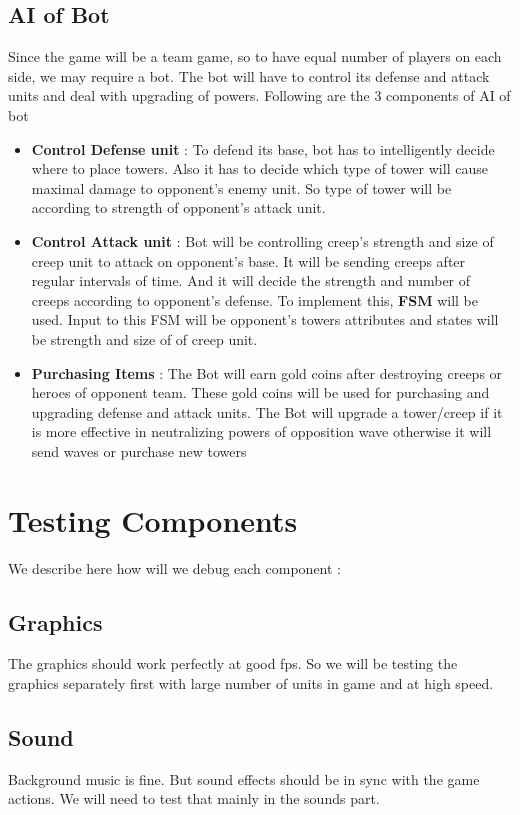 \documentclass{article}
\begin{document}
\subsection{AI of Bot}
Since the game will be a team game, so to have equal number of players on each side, we may require a bot. The bot will have to control its defense and attack units and deal with upgrading of powers. Following are the 3 components of AI of bot
\begin{itemize}
\item \textbf{Control Defense unit} : To defend its base, bot has to intelligently decide where to place towers. Also it has to decide which type of tower will cause maximal damage to opponent's enemy unit. So type of tower will be according to strength of opponent's attack unit.

\item \textbf{Control Attack unit} : Bot will be controlling creep's strength and size of creep unit to attack on opponent's base. It will be sending creeps after regular intervals of time. And it will decide the strength and number of creeps according to opponent's defense. To implement this, \textbf{FSM} will be used. Input to this FSM will be opponent's towers attributes and states will be strength and size of of creep unit. 

\item \textbf{Purchasing Items} : The Bot will earn gold coins after destroying creeps or heroes of opponent team. These gold coins will be used for purchasing and upgrading defense and attack units. The Bot will upgrade a tower/creep if it is more effective in neutralizing powers of opposition wave otherwise it will send waves or purchase new towers
\end{itemize}

\newpage
\section{Testing Components}
We describe here how will we debug each component :

\subsection{Graphics}
The graphics should work perfectly at good fps. So we will be testing the graphics separately first with large number of units in game and at high speed.
\subsection{Sound}
Background music is fine. But sound effects should be in sync with the game actions. We will need to test that mainly in the sounds part.
\end{document}
